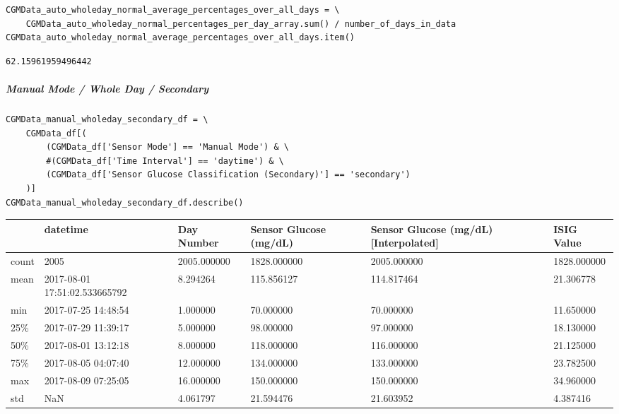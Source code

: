 \begin{verbatim}
CGMData_auto_wholeday_normal_average_percentages_over_all_days = \
    CGMData_auto_wholeday_normal_percentages_per_day_array.sum() / number_of_days_in_data
CGMData_auto_wholeday_normal_average_percentages_over_all_days.item()
\end{verbatim}

\begin{verbatim}
62.15961959496442
\end{verbatim}

\subparagraph{Manual Mode / Whole Day / Secondary}

\begin{verbatim}
CGMData_manual_wholeday_secondary_df = \
    CGMData_df[(
        (CGMData_df['Sensor Mode'] == 'Manual Mode') & \
        #(CGMData_df['Time Interval'] == 'daytime') & \
        (CGMData_df['Sensor Glucose Classification (Secondary)'] == 'secondary')
    )]
CGMData_manual_wholeday_secondary_df.describe()
\end{verbatim}

\bigskip\noindent
\begin{tabular}{p{}p{}p{}p{}p{}p{}}
\toprule
 & datetime & Day Number & Sensor Glucose (mg/dL) & Sensor Glucose (mg/dL) [Interpolated] & ISIG Value \\
\hline
count & 2005 & 2005.000000 & 1828.000000 & 2005.000000 & 1828.000000 \\
\hline
mean & 2017-08-01 17:51:02.533665792 & 8.294264 & 115.856127 & 114.817464 & 21.306778 \\
\hline
min & 2017-07-25 14:48:54 & 1.000000 & 70.000000 & 70.000000 & 11.650000 \\
\hline
25\% & 2017-07-29 11:39:17 & 5.000000 & 98.000000 & 97.000000 & 18.130000 \\
\hline
50\% & 2017-08-01 13:12:18 & 8.000000 & 118.000000 & 116.000000 & 21.125000 \\
\hline
75\% & 2017-08-05 04:07:40 & 12.000000 & 134.000000 & 133.000000 & 23.782500 \\
\hline
max & 2017-08-09 07:25:05 & 16.000000 & 150.000000 & 150.000000 & 34.960000 \\
\hline
std & NaN & 4.061797 & 21.594476 & 21.603952 & 4.387416 \\
\hline
\bottomrule
\end{tabular}

